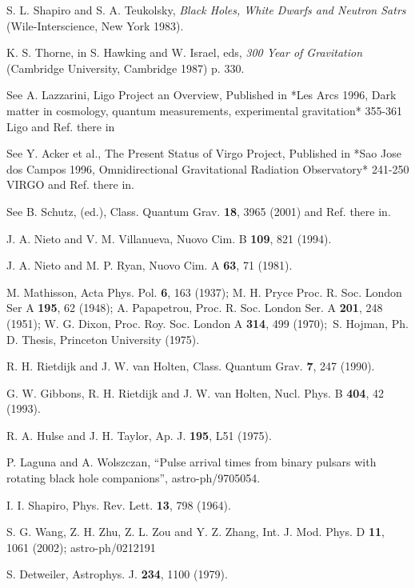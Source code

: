 \documentclass[a4paper,12pt]{article}
\begin{document}
\begin{thebibliography}{99}
  S. L. Shapiro and S. A. Teukolsky, \textit{Black Holes, White
Dwarfs and Neutron Satrs} (Wile-Interscience, New York 1983).

  K. S. Thorne, in S. Hawking and W. Israel, eds, \textit{300
Year of Gravitation} (Cambridge University, Cambridge 1987) p. 330.

  See A. Lazzarini, Ligo Project an Overview, Published in *Les
Arcs 1996, Dark matter in cosmology, quantum measurements, experimental
gravitation* 355-361 Ligo and Ref. there in

  See Y. Acker et al., The Present Status of Virgo Project,
Published in *Sao Jose dos Campos 1996, Omnidirectional Gravitational
Radiation Observatory* 241-250 VIRGO and Ref. there in.

  See B. Schutz, (ed.), Class. Quantum Grav. \textbf{18}, 3965
(2001) and Ref. there in.

  J. A. Nieto and V. M. Villanueva, Nuovo Cim. B \textbf{109},
821 (1994).

  J. A. Nieto and M. P. Ryan, Nuovo Cim. A \textbf{63}, 71 (1981).

  M. Mathisson, Acta Phys. Pol. \textbf{6}, 163 (1937); M. H.
Pryce Proc. R. Soc. London Ser A \textbf{195}, 62 (1948); A. Papapetrou,
Proc. R. Soc. London Ser. A \textbf{201}, 248 (1951); W. G. Dixon, Proc.
Roy. Soc. London A \textbf{314}, 499 (1970);\ S. Hojman, Ph. D. Thesis,
Princeton University (1975).

  R. H. Rietdijk and J. W. van Holten, Class. Quantum Grav. 
\textbf{7}, 247 (1990).

  G. W. Gibbons, R. H. Rietdijk and J. W. van Holten, Nucl.
Phys. B \textbf{404}, 42 (1993).

  R. A. Hulse and J. H. Taylor, Ap. J. \textbf{195}, L51 (1975).

  P. Laguna and A. Wolszczan, ``Pulse arrival times from binary
pulsars with rotating black hole companions'', astro-ph/9705054.

  I. I. Shapiro, Phys. Rev. Lett. \textbf{13}, 798 (1964).

  S. G. Wang, Z. H. Zhu, Z. L. Zou and Y. Z. Zhang, Int. J. Mod.
Phys. D \textbf{11}, 1061 (2002); astro-ph/0212191

  S. Detweiler, Astrophys. J. \textbf{234}, 1100 (1979).


\end{thebibliography}
\end{document}
